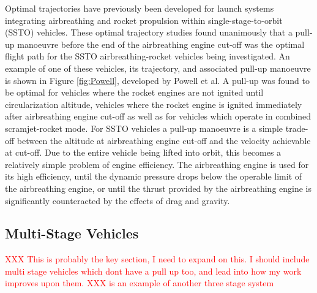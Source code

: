 Optimal trajectories have previously been developed for launch systems integrating airbreathing and rocket propulsion within single-stage-to-orbit (SSTO) vehicles\cite{Powell1991,Lu1993,Trefny1999,Roche2000,Pescetelli2012,Young2006,Bradford2000}. These optimal trajectory studies found unanimously that a pull-up manoeuvre before the end of the airbreathing engine cut-off was the optimal flight path for the SSTO airbreathing-rocket vehicles being investigated. An example of one of these vehicles, its trajectory, and associated pull-up manoeuvre is shown in Figure \ref{fig:Powell}, developed by Powell et al\cite{Powell1991}. A pull-up was found to be optimal for vehicles where the rocket engines are not ignited until circularization altitude\cite{Powell1991,Lu1993}, vehicles where the rocket engine is ignited immediately after airbreathing engine cut-off\cite{Trefny1999,Roche2000,Pescetelli2012} as well as for vehicles which operate in combined scramjet-rocket mode\cite{Young2006,Bradford2000}. For SSTO vehicles a pull-up manoeuvre is a simple trade-off between the altitude at airbreathing engine cut-off and the velocity achievable at cut-off. Due to the entire vehicle being lifted into orbit, this becomes a relatively simple problem of engine efficiency. The airbreathing engine is used for its high efficiency, until the dynamic pressure drops below the operable limit of the airbreathing engine, or until the thrust provided by the airbreathing engine is significantly counteracted by the effects of drag and gravity. 

 
 \subsection{Multi-Stage Vehicles}
\textcolor{red}{XXX This is probably the key section, I need to expand on this. I should include multi stage vehicles which dont have a pull up too, and lead into how my work improves upon them.}
\textcolor{red}{XXX \cite{Kimura1999} is an example of another three stage system}

